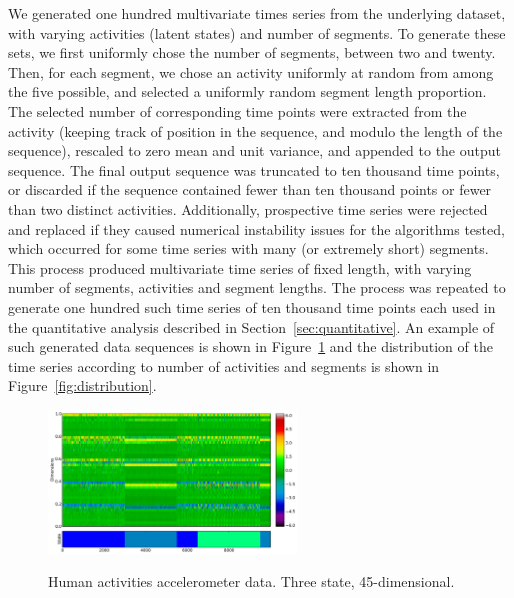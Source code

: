 \documentclass[letterpaper]{article}
\begin{document}
We generated one hundred multivariate times series from the underlying dataset,
with varying activities (latent states) and number of segments. To generate
these sets, we first uniformly chose the number of
segments, between two and twenty. Then, for each segment, we chose an activity
uniformly at random from among the five possible, and selected a uniformly
random segment length proportion. The selected number of corresponding time
points were extracted from the activity (keeping track of position in the
sequence, and modulo the length of the sequence), rescaled to zero mean and unit
variance, and appended to the output sequence. The final output sequence was
truncated to ten thousand time points, or discarded if the sequence contained
fewer than ten thousand points or fewer than two distinct activities.
Additionally, prospective time series were rejected and replaced if they caused
numerical instability issues for the algorithms tested, which occurred for some
time series with many (or extremely short) segments. This process produced
multivariate time series of fixed length, with varying number of segments,
activities and segment lengths. The process was repeated to generate one hundred
such time series of ten thousand time points each used in the quantitative
analysis described in Section~\ref{sec:quantitative}. An example of such
generated data sequences is shown in Figure~\ref{fig:accelerometer} and the
distribution of the time series according to number of activities and segments
is shown in Figure~\ref{fig:distribution}.
\vspace{-0.1cm}
\begin{figure}[htbp]
  \centering
    \includegraphics[width=1.\linewidth, height=1.5in]{images/accelerometer-data.pdf}
    \label{fig:accelerometer}
    \vspace{-0.5cm}
  \caption{\small{Human activities accelerometer data. Three state,
  45-dimensional.}}
\end{figure}
\vspace{-0.5cm}
\end{document}
